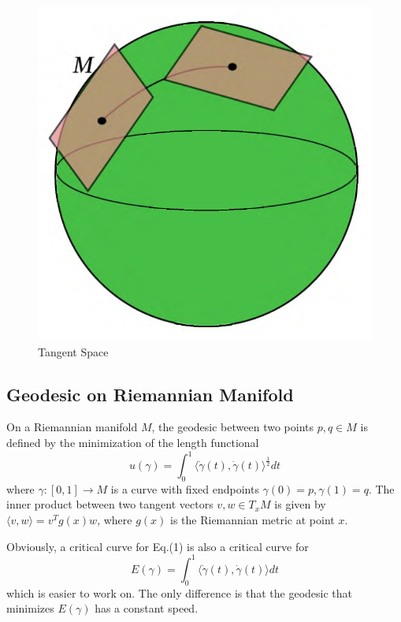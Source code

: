 \documentclass{article}
\theoremstyle{definition}
\theoremstyle{plain}
\begin{document}
\begin{figure}[H]
   \centering
   \includegraphics[scale=0.3]{figure/tangentspace.png}
   \caption{Tangent Space}
\end{figure}

\subsection{Geodesic on Riemannian Manifold}

On a Riemannian manifold $M$, the geodesic between two points $p,q\in M$ is defined by the minimization of the length functional
\begin{equation}
    u(\gamma)=\int^1_0\langle\Dot{\gamma}(t),\Dot{\gamma}(t)\rangle^\frac{1}{2}dt
\end{equation}
where $\gamma:[0,1]\rightarrow M$ is a curve with fixed endpoints $\gamma(0)=p, \gamma(1)=q$. The inner product between two tangent vectors $v,w\in T_xM$ is given by $\langle v,w\rangle=v^Tg(x)w$, where $g(x)$ is the Riemannian metric at point $x$.

Obviously, a critical curve for Eq.(1) is also a critical curve for
\begin{equation}
    E(\gamma)=\int^1_0\langle\Dot{\gamma}(t),\Dot{\gamma}(t)\rangle dt
\end{equation}
which is easier to work on. The only difference is that the geodesic that minimizes $E(\gamma)$ has a constant speed.
\end{document}
